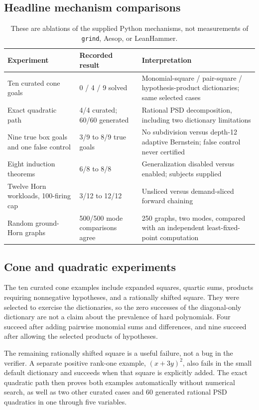\documentclass[11pt,letterpaper]{article}
\newcommand{\grind}{\texttt{grind}}
\theoremstyle{definition}
\theoremstyle{remark}
\begin{document}
\subsection{Headline mechanism comparisons}
\begin{table}[htbp]
\centering\small
\begin{tabularx}{\textwidth}{@{}p{}p{}Y@{}}
\toprule
Experiment & Recorded result & Interpretation \\
\midrule
Ten curated cone goals & 0 / 4 / 9 solved & Monomial-square / pair-square / hypothesis-product dictionaries; same selected cases \\
Exact quadratic path & 4/4 curated; 60/60 generated & Rational PSD decomposition, including two dictionary limitations \\
Nine true box goals and one false control & 3/9 to 8/9 true goals & No subdivision versus depth-12 adaptive Bernstein; false control never certified \\
Eight induction theorems & 6/8 to 8/8 & Generalization disabled versus enabled; subjects supplied \\
Twelve Horn workloads, 100-firing cap & 3/12 to 12/12 & Unsliced versus demand-sliced forward chaining \\
Random ground-Horn graphs & 500/500 mode comparisons agree & 250 graphs, two modes, compared with an independent least-fixed-point computation \\
\bottomrule
\end{tabularx}
\caption{These are ablations of the supplied Python mechanisms, not measurements of \grind{}, Aesop, or LeanHammer.}
\end{table}

\subsection{Cone and quadratic experiments}
The ten curated cone examples include expanded squares, quartic sums, products requiring nonnegative hypotheses, and a rationally shifted square. They were selected to exercise the dictionaries, so the zero successes of the diagonal-only dictionary are not a claim about the prevalence of hard polynomials. Four succeed after adding pairwise monomial sums and differences, and nine succeed after allowing the selected products of hypotheses.

The remaining rationally shifted square is a useful failure, not a bug in the verifier. A separate positive rank-one example, $(x+3y)^2$, also fails in the small default dictionary and succeeds when that square is explicitly added. The exact quadratic path then proves both examples automatically without numerical search, as well as two other curated cases and 60 generated rational PSD quadratics in one through five variables.
\end{document}
